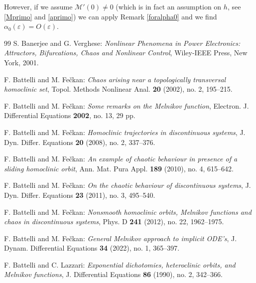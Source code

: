 \documentclass[10pt]{article}
\numberwithin{equation}{section}
\def\al{\alpha}
\def\ep{\varepsilon}
\def\MM{{\mathcal M}}
\theoremstyle{definition}
\theoremstyle{remark}
\begin{document}
However, if we assume   $\MM'(0) \ne 0$   (which is in fact an assumption on $h$, see \eqref{Mprimo} and \eqref{aprimo}) we can apply
Remark \ref{foralpha0} and we find $\al_0(\ep)=O(\ep)$.










\begin{thebibliography}{99}
 {\sc S. Banerjee and G. Verghese}: {\it Nonlinear Phenomena in Power
Electronics: Attractors, Bifurcations, Chaos and Nonlinear
Control}, Wiley-IEEE Press, New York, 2001.

	 {\sc  F. Battelli and M. Fe\v ckan}: {\it Chaos arising
		near a topologically transversal homoclinic set},
	Topol. Methods Nonlinear Anal. {\bf 20} (2002), no. 2, 195--215.

 {\sc  F. Battelli and M. Fe\v ckan}: {\it Some remarks on
the Melnikov function},
Electron. J. Differential Equations {\bf 2002}, no. 13, 29 pp.
	
	 {\sc  F. Battelli and M. Fe\v ckan}: {\it Homoclinic trajectories in discontinuous systems},
	J. Dyn. Differ. Equations {\bf 20} (2008), no. 2,  337--376.
	
	 {\sc  F. Battelli and M. Fe\v ckan}: {\it   An example of chaotic behaviour in presence of a sliding homoclinic orbit},
Ann. Mat. Pura Appl. \textbf{189}
(2010), no. 4, 615--642.
	
	 {\sc  F. Battelli and M. Fe\v ckan}: {\it On the chaotic behaviour of discontinuous systems},
	J. Dyn. Differ. Equations {\bf 23} (2011), no. 3, 495--540.
	
	 {\sc  F. Battelli and M. Fe\v ckan}: {\it  Nonsmooth homoclinic orbits, Melnikov functions and chaos in discontinuous
systems}, Phys. D \textbf{241}
(2012), no. 22, 1962--1975.


 {\sc  F. Battelli and M. Fe\v ckan}: {\it General Melnikov approach to implicit ODE's}, J. Dynam. Differential Equations {\bf
    34} (2022), no. 1, 365--397.
	
 {\sc F. Battelli and C. Lazzari}: {\it Exponential
dichotomies, heteroclinic orbits, and Melnikov functions},
J. Differential Equations {\bf 86} (1990), no. 2, 342--366.


\end{thebibliography}
\end{document}
